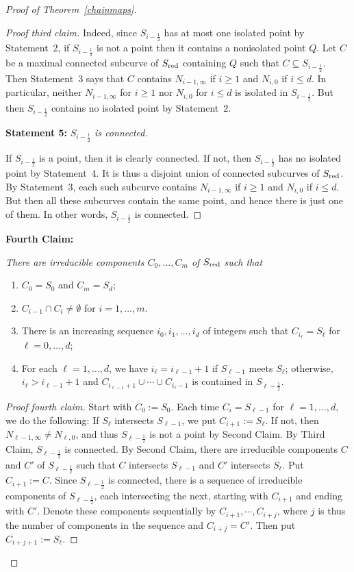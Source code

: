 \documentclass[10pt,a4paper]{amsart}
\def\red{\text{\rm red}}
\begin{document}
\begin{proof}[Proof of Theorem~\ref{chainmaps}]
\begin{proof}[Proof third claim]
Indeed, since $S_{i-\frac{1}{2}}$ has at most one isolated point by Statement~2, if $S_{i-\frac{1}{2}}$ is not a point then it contains a nonisolated point $Q$. Let $C$ be a maximal connected subcurve of $S_\red$ containing $Q$ such that $C\subseteq S_{i-\frac{1}{2}}$. Then Statement~3 says that $C$ contains $N_{i-1,\infty}$ if $i\geq 1$ and $N_{i,0}$ if $i\leq d$. In particular, neither $N_{i-1,\infty}$ for $i\geq 1$ nor $N_{i,0}$ for $i\leq d$ is isolated in $S_{i-\frac{1}{2}}$. But then $S_{i-\frac{1}{2}}$ contains no isolated point by Statement~2.

\vskip0.1cm

{\bf Statement 5:} {\it $S_{i-\frac{1}{2}}$ is connected.}

If $S_{i-\frac{1}{2}}$ is a point, then it is clearly connected. If not, then $S_{i-\frac{1}{2}}$ has no isolated point by Statement~4. It is thus a disjoint union of connected subcurves of $S_\red$. By Statement~3, each such subcurve contains $N_{i-1,\infty}$ if $i\geq 1$ and $N_{i,0}$ if $i\leq d$. But then all these subcurves contain the same point, and hence there is just one of them. In other words, $S_{i-\frac{1}{2}}$ is connected.
\end{proof}

{\bf Fourth Claim:} {\it There are irreducible components $C_0,\dots,C_m$ of $S_\red$ such that
\begin{enumerate} 
\item $C_0=S_0$ and $C_m=S_d$;
\item $C_{i-1}\cap C_i\neq\emptyset$ for $i=1,\dots,m$. 
\item There is an increasing sequence $i_0,i_1,\dots,i_d$ of integers such that $C_{i_\ell}=S_\ell$ for $\ell=0,\dots,d$;
\item For each $\ell=1,\dots,d$, we have $i_{\ell}=i_{\ell-1}+1$ if $S_{\ell-1}$ meets $S_\ell$; otherwise, $i_{\ell}>i_{\ell-1}+1$ and $C_{i_{\ell-1}+1}\cup\cdots\cup C_{i_{\ell}-1}$ is contained in $S_{\ell-\frac{1}{2}}$.
\end{enumerate}}

\begin{proof}[Proof fourth claim]
Start with $C_0:=S_0$. Each time $C_i=S_{\ell-1}$ for $\ell=1,\dots,d$, we do the following: If $S_{\ell}$ intersects $S_{\ell-1}$, we put $C_{i+1}:=S_\ell$. If not, then $N_{\ell-1,\infty}\neq N_{\ell,0}$, and thus $S_{\ell-\frac{1}{2}}$ is not a point by Second Claim. By Third Claim, $S_{\ell-\frac{1}{2}}$ is connected. By Second Claim, there are irreducible components $C$ and $C'$ of $S_{\ell-\frac{1}{2}}$ such that $C$ intersects $S_{\ell-1}$ and $C'$ intersects $S_\ell$. Put $C_{i+1}:=C$. Since $S_{\ell-\frac{1}{2}}$ is connected, there is a sequence of irreducible components of $S_{\ell-\frac{1}{2}}$, each intersecting the next, starting with $C_{i+1}$ and ending with $C'$. Denote these components sequentially by $C_{i+1},\cdots,C_{i+j}$, where $j$ is thus the number of components in the sequence and $C_{i+j}=C'$. Then put $C_{i+j+1}:=S_{\ell}$.
\end{proof} 


\end{proof}
\end{document}
